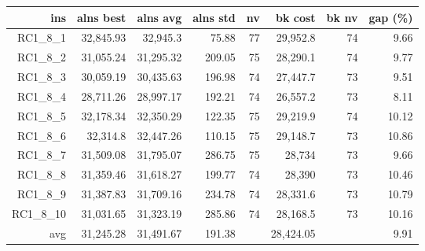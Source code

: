   \begin{table}[caption={Kết quả đo với tập HG\_RC\_1\_8 800 yêu cầu}, label=exp:HGRC18]
    \small
    \centering
    \begin{tabular}{rrrrrrrr}
    \hline
    ins & alns best & alns avg & alns std & nv & bk cost & bk nv & gap (\%) \\ \hline
    RC1\_8\_1 & 32,845.93 & 32,945.3 & 75.88 & 77 & 29,952.8 & 74 & 9.66 \\ \hline
    RC1\_8\_2 & 31,055.24 & 31,295.32 & 209.05 & 75 & 28,290.1 & 74 & 9.77 \\ \hline
    RC1\_8\_3 & 30,059.19 & 30,435.63 & 196.98 & 74 & 27,447.7 & 73 & 9.51 \\ \hline
    RC1\_8\_4 & 28,711.26 & 28,997.17 & 192.21 & 74 & 26,557.2 & 73 & 8.11 \\ \hline
    RC1\_8\_5 & 32,178.34 & 32,350.29 & 122.35 & 75 & 29,219.9 & 74 & 10.12 \\ \hline
    RC1\_8\_6 & 32,314.8 & 32,447.26 & 110.15 & 75 & 29,148.7 & 73 & 10.86 \\ \hline
    RC1\_8\_7 & 31,509.08 & 31,795.07 & 286.75 & 75 & 28,734 & 73 & 9.66 \\ \hline
    RC1\_8\_8 & 31,359.46 & 31,618.27 & 199.77 & 74 & 28,390 & 73 & 10.46 \\ \hline
    RC1\_8\_9 & 31,387.83 & 31,709.16 & 234.78 & 74 & 28,331.6 & 73 & 10.79 \\ \hline
    RC1\_8\_10 & 31,031.65 & 31,323.19 & 285.86 & 74 & 28,168.5 & 73 & 10.16 \\ \hline
    avg & 31,245.28 & 31,491.67 & 191.38 & & 28,424.05 & & 9.91 \\ \hline
    \end{tabular}
  \end{table}


